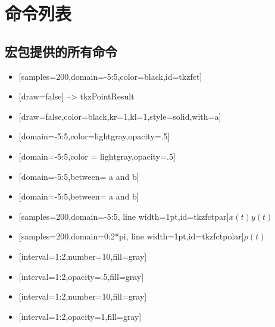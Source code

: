 \documentclass[../main.tex]{subfiles}
\begin{document}
\section{命令列表}

\subsection{宏包提供的所有命令}

\begin{itemize}
\item {}[samples=200,domain=-5:5,color=black,id=tkzfct]
\item {}[draw=false] --> tkzPointResult
\item {}[draw=false,color=black,kr=1,kl=1,style=solid,with=a]
\item {}[domain=-5:5,color=lightgray,opacity=.5]
\item {}[domain=-5:5,color = lightgray,opacity=.5]
\item {}[domain=-5:5,between= a and b]
\item {}[domain=-5:5,between= a and b]
\item {}[samples=200,domain=-5:5,
                             line width=1pt,id=tkzfctpar]{$x(t)$}{$y(t)$}
\item {}[samples=200,domain=0:2*pi,
                             line width=1pt,id=tkzfctpolar]{$\rho(t)$}
\item {}[interval=1:2,number=10,fill=gray]
\item {} [interval=1:2,opacity=.5,fill=gray]
\item {} [interval=1:2,number=10,fill=gray]
\item {}[interval=1:2,opacity=1,fill=gray]
\end{itemize}
\end{document}

